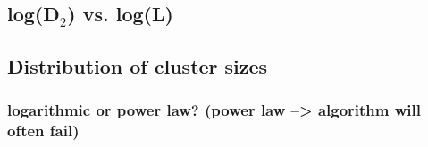 \documentclass{umthesis}
\begin{document}
\subsection{log(D$_2$) vs. log(L)}
\label{sec-4.5.2}
\subsection{Distribution of cluster sizes}
\label{sec-4.5.3}
\subsubsection{logarithmic or power law? (power law --> algorithm will often fail)}
\label{sec-4.5.3.1}



\end{document}
